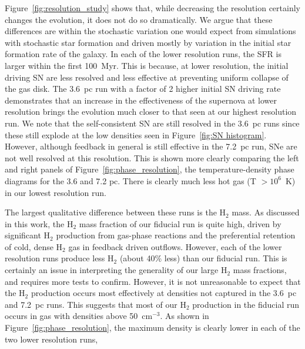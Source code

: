 \documentclass[twocolumn]{aastex61}
\begin{document}
Figure~\ref{fig:resolution_study} shows that, while decreasing the resolution certainly changes the evolution, it does not do so dramatically. We argue that these differences are within the stochastic variation one would expect from simulations with stochastic star formation and driven mostly by variation in the initial star formation rate of the galaxy. In each of the lower resolution runs, the SFR is larger within the first 100~Myr. This is because, at lower resolution, the initial driving SN are less resolved and less effective at preventing uniform collapse of the gas disk. The 3.6~pc run with a factor of 2 higher initial SN driving rate demonstrates that an increase in the effectiveness of the supernova at lower resolution brings the evolution much closer to that seen at our highest resolution run. We note that the self-consistent SN are still resolved in the 3.6~pc runs since these still explode at the low densities seen in Figure~\ref{fig:SN histogram}. However, although feedback in general is still effective in the 7.2~pc run, SNe are not well resolved at this resolution. This is shown more clearly comparing the left and right panels of Figure~\ref{fig:phase_resolution}, the temperature-density phase diagrams for the 3.6 and 7.2 pc. There is clearly much less hot gas (T $> 10^6$~K) in our lowest resolution run. 

The largest qualitative difference between these runs is the H$_2$ mass. As discussed in this work, the H$_2$ mass fraction of our fiducial run is quite high, driven by significant H$_2$ production from gas-phase reactions and the preferential retention of cold, dense H$_2$ gas in feedback driven outflows. However, each of the lower resolution runs produce less H$_2$ (about 40\% less) than our fiducial run. This is certainly an issue in interpreting the generality of our large H$_2$ mass fractions, and requires more tests to confirm. However, it is not unreasonable to expect that the H$_2$ production occurs most effectively at densities not captured in the 3.6~pc and 7.2~pc runs. This suggests that most of our H$_2$ production in the fiducial run occurs in gas with densities above 50~cm$^{-3}$. As shown in Figure~\ref{fig:phase_resolution}, the maximum density is clearly lower in each of the two lower resolution runs, 
\end{document}
